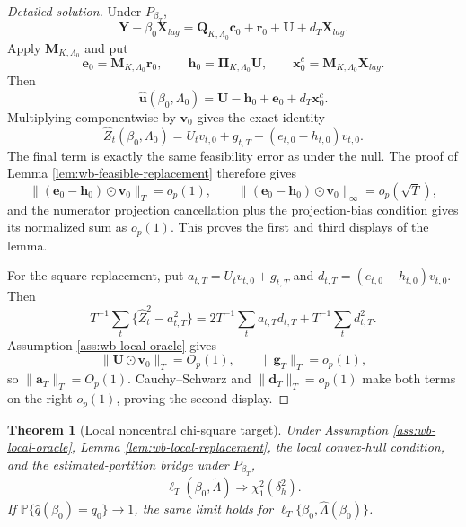 \documentclass[12pt]{article}
\numberwithin{equation}{section}
\newtheorem{theorem}{Theorem}
\theoremstyle{definition}
\newcommand{\Pp}{\mathbb P}
\begin{document}
\begin{proof}[Detailed solution]
Under \(P_{\beta_T}\),
\[
    \bm Y-\beta_0\bm X_{lag}
    =\bm Q_{K,\Lambda_0}\bm c_0+
      \bm r_0+\bm U+d_T\bm X_{lag}.
\]
Apply \(\bm M_{K,\Lambda_0}\) and put
\[
    \bm e_0=\bm M_{K,\Lambda_0}\bm r_0,
    \qquad
    \bm h_0=\bm\Pi_{K,\Lambda_0}\bm U,
    \qquad
    \bm x_0^c=\bm M_{K,\Lambda_0}\bm X_{lag}.
\]
Then
\[
    \widehat{\bm u}(\beta_0,\Lambda_0)
    =\bm U-\bm h_0+\bm e_0+d_T\bm x_0^c.
\]
Multiplying componentwise by \(\bm v_0\) gives the exact identity
\[
    \widehat Z_t(\beta_0,\Lambda_0)
    =U_tv_{t,0}+g_{t,T}+(e_{t,0}-h_{t,0})v_{t,0}.
\]
The final term is exactly the same feasibility error as under the null.  The
proof of Lemma \ref{lem:wb-feasible-replacement} therefore gives
\[
    \|(\bm e_0-\bm h_0)\odot\bm v_0\|_T=o_p(1),
    \qquad
    \|(\bm e_0-\bm h_0)\odot\bm v_0\|_\infty=o_p(\sqrt T),
\]
and the numerator projection cancellation plus the projection-bias condition
gives its normalized sum as \(o_p(1)\).  This proves the first and third
displays of the lemma.

For the square replacement, put
\(a_{t,T}=U_tv_{t,0}+g_{t,T}\) and
\(d_{t,T}=(e_{t,0}-h_{t,0})v_{t,0}\).  Then
\[
    T^{-1}\sum_t
      \{\widehat Z_t^2-a_{t,T}^2\}
    =2T^{-1}\sum_ta_{t,T}d_{t,T}
      +T^{-1}\sum_td_{t,T}^2.
\]
Assumption \ref{ass:wb-local-oracle} gives
\[
    \|\bm U\odot\bm v_0\|_T=O_p(1),
    \qquad
    \|\bm g_T\|_T=o_p(1),
\]
so \(\|\bm a_T\|_T=O_p(1)\).  Cauchy--Schwarz and
\(\|\bm d_T\|_T=o_p(1)\) make both terms on the right \(o_p(1)\), proving the
second display.
\end{proof}


\begin{theorem}[Local noncentral chi-square target]
\label{thm:wb-local-power}
Under Assumption \ref{ass:wb-local-oracle}, Lemma \ref{lem:wb-local-replacement}, the local convex-hull condition, and the estimated-partition bridge under \(P_{\beta_T}\),
\[
    \ell_T(\beta_0,\widetilde\Lambda)
    \Rightarrow
    \chi_1^2(\delta_h^2).
\]
If \(\Pp\{\widehat q(\beta_0)=q_0\}\to1\), the same limit holds for \(\ell_T\{\beta_0,\widehat\Lambda(\beta_0)\}\).
\end{theorem}
\end{document}
